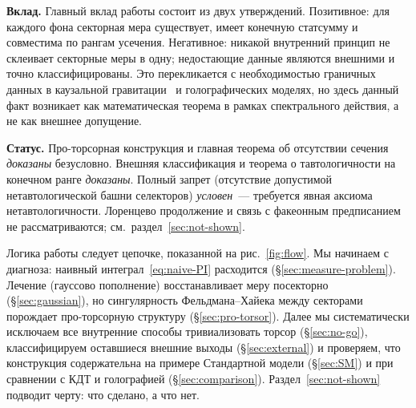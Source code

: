 \documentclass[12pt,a4paper]{article}
\theoremstyle{plain}
\theoremstyle{definition}
\theoremstyle{remark}
\begin{document}
\medskip

\noindent\textbf{Вклад.}\quad
Главный вклад работы состоит из двух утверждений. Позитивное: для каждого фона секторная мера существует, имеет конечную статсумму и совместима по рангам усечения. Негативное: никакой внутренний принцип не склеивает секторные меры в одну; недостающие данные являются внешними и точно классифицированы. Это перекликается с необходимостью граничных данных в каузальной гравитации~\cite{Surya:2019,AJL:2012} и голографических моделях, но здесь данный факт возникает как математическая теорема в рамках спектрального действия, а не как внешнее допущение.

\medskip

\noindent\textbf{Статус.}\quad
Про-торсорная конструкция и главная теорема об отсутствии сечения
\emph{доказаны} безусловно.  Внешняя классификация и теорема о
тавтологичности на конечном ранге \emph{доказаны}.  Полный запрет
(отсутствие допустимой нетавтологической башни селекторов)
\emph{условен}~--- требуется явная аксиома нетавтологичности.
Лоренцево продолжение и связь с факеонным предписанием~\cite{Anselmi:2018} не рассматриваются;
см.\ раздел~\ref{sec:not-shown}.

\medskip

Логика работы следует цепочке, показанной на рис.~\ref{fig:flow}. Мы начинаем с диагноза: наивный интеграл~\eqref{eq:naive-PI} расходится (\S\ref{sec:measure-problem}). Лечение (гауссово пополнение) восстанавливает меру посекторно (\S\ref{sec:gaussian}), но сингулярность Фельдмана--Хайека между секторами порождает про-торсорную структуру (\S\ref{sec:pro-torsor}). Далее мы систематически исключаем все внутренние способы тривиализовать торсор (\S\ref{sec:no-go}), классифицируем оставшиеся внешние выходы (\S\ref{sec:external}) и проверяем, что конструкция содержательна на примере Стандартной модели (\S\ref{sec:SM}) и при сравнении с КДТ и голографией (\S\ref{sec:comparison}). Раздел~\ref{sec:not-shown} подводит черту: что сделано, а что нет.
\end{document}
